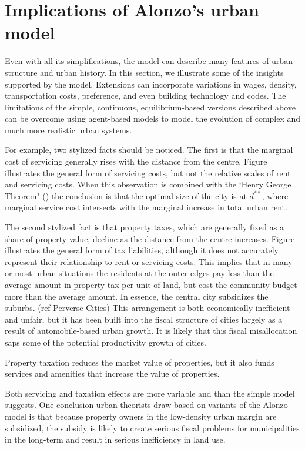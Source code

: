 \section{Implications of Alonzo's urban model}
Even with all its simplifications, the model  can  describe  many features of urban structure and urban history. In this section, we illustrate some of the insights supported by the model. Extensions can incorporate variations in wages, density, transportation costs,  preference, and even building technology and codes. The limitations of the simple, continuous, equilibrium-based versions described above can be overcome using agent-based models to model the evolution of complex and much more realistic urban systems. 

For example, two stylized facts should be noticed. The first is that the marginal cost of servicing generally  rises with the distance from the centre.  Figure
illustrates the general form of servicing costs, but not  the relative scales of rent and servicing costs. When this observation is combined with the `Henry George Theorem" () the conclusion is that the optimal size of the city  is at  $d^{**}$, where marginal service cost intersects with the marginal increase in total urban rent. 

The second stylized fact  is that property taxes, which are generally  fixed as a share of property value, decline as the distance from the centre increases. Figure %
illustrates the general form of tax liabilities, although it does not  accurately represent their relationship to rent or  servicing costs.  This implies that in many or most urban situations the residents at the outer edges pay less than the average amount in property tax per unit of land, but cost  the community budget more than the average amount. In essence, the central city subsidizes the suburbs. (ref Perverse Cities)
This arrangement is both economically inefficient and unfair, but it has been built into the fiscal structure of cities largely as a result of automobile-based urban growth. It is likely that this fiscal misallocation saps some of the potential productivity growth of cities.

Property taxation reduces the market value of properties, but it also funds services and amenities that increase the value of properties. 

Both servicing and taxation effects are more variable and than the simple model suggests.  One conclusion urban theorists draw based on variants of the Alonzo model is that because property owners in the low-density urban margin are subsidized,  the subsidy is likely to create serious fiscal problems for municipalities in the long-term and result in serious inefficiency in land use.

